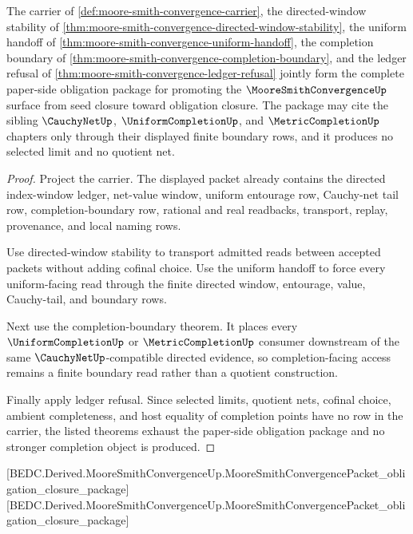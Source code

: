 \begin{theorem}
\label{thm:moore-smith-convergence-obligation-closure-package}
The carrier of \autoref{def:moore-smith-convergence-carrier}, the directed-window stability of \autoref{thm:moore-smith-convergence-directed-window-stability}, the uniform handoff of \autoref{thm:moore-smith-convergence-uniform-handoff}, the completion boundary of \autoref{thm:moore-smith-convergence-completion-boundary}, and the ledger refusal of \autoref{thm:moore-smith-convergence-ledger-refusal} jointly form the complete paper-side obligation package for promoting the $\MooreSmithConvergenceUp$ surface from seed closure toward obligation closure. The package may cite the sibling $\CauchyNetUp$, $\UniformCompletionUp$, and $\MetricCompletionUp$ chapters only through their displayed finite boundary rows, and it produces no selected limit and no quotient net.
\end{theorem}
\begin{proof}
Project the carrier. The displayed packet already contains the directed index-window ledger, net-value window, uniform entourage row, Cauchy-net tail row, completion-boundary row, rational and real readbacks, transport, replay, provenance, and local naming rows.

Use directed-window stability to transport admitted reads between accepted packets without adding cofinal choice. Use the uniform handoff to force every uniform-facing read through the finite directed window, entourage, value, Cauchy-tail, and boundary rows.

Next use the completion-boundary theorem. It places every $\UniformCompletionUp$ or $\MetricCompletionUp$ consumer downstream of the same $\CauchyNetUp$-compatible directed evidence, so completion-facing access remains a finite boundary read rather than a quotient construction.

Finally apply ledger refusal. Since selected limits, quotient nets, cofinal choice, ambient completeness, and host equality of completion points have no row in the carrier, the listed theorems exhaust the paper-side obligation package and no stronger completion object is produced.
\end{proof}

[BEDC.Derived.MooreSmithConvergenceUp.MooreSmithConvergencePacket\_obligation\_closure\_package]
[BEDC.Derived.MooreSmithConvergenceUp.MooreSmithConvergencePacket\_obligation\_closure\_package]

